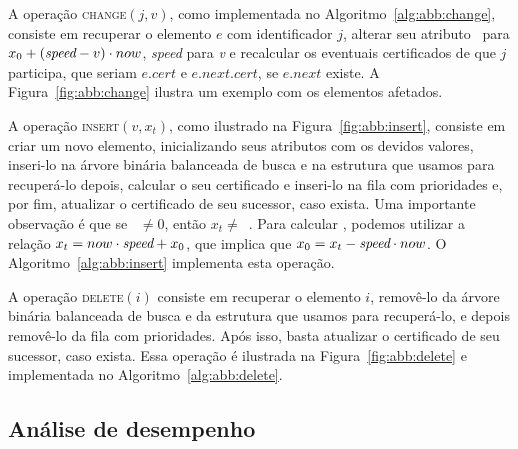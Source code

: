 





A operação \textsc{change}$(j, v)$, como implementada no Algoritmo~\ref{alg:abb:change}, consiste em
recuperar o elemento $e$ com identificador $j$, alterar seu atributo \initv~para $x_0 +
(\textit{speed} - v)\cdot now$, \textit{speed} para \textit{v} e
recalcular os eventuais certificados de que $j$ participa, que
seriam $e.cert$ e $e.next.cert$, se $e.next$ existe.
A Figura~\ref{fig:abb:change} ilustra um exemplo com os elementos afetados.





A operação \textsc{insert}$(v, x_t)$, como ilustrado na Figura~\ref{fig:abb:insert}, consiste em
criar um novo elemento, inicializando seus atributos com os devidos valores, inseri-lo na
árvore binária balanceada de busca e na estrutura que usamos para
recuperá-lo depois, calcular o seu certificado e inseri-lo na fila
com prioridades e, por fim, atualizar o certificado de seu sucessor,
caso exista.
Uma importante observação é que se \now~$\neq 0$, então $x_t \neq$~\initv.
Para calcular \initv, podemos utilizar a relação
${x_t = now\cdot \textit{speed} + x_0}$, que implica que ${x_0 = x_t -
\textit{speed}\cdot now}$.
O Algoritmo~\ref{alg:abb:insert} implementa esta operação.





A operação \textsc{delete}$(i)$ consiste em recuperar o elemento
$i$, removê-lo da árvore binária balanceada de busca e da estrutura
que usamos para recuperá-lo, e depois removê-lo da fila com
prioridades.
Após isso, basta atualizar o certificado de seu sucessor, caso exista.
Essa operação é ilustrada na Figura~\ref{fig:abb:delete} e implementada no
Algoritmo~\ref{alg:abb:delete}.





\FloatBarrier

\subsection{Análise de desempenho}\label{subsec:analise-de-desempenho-abb}

